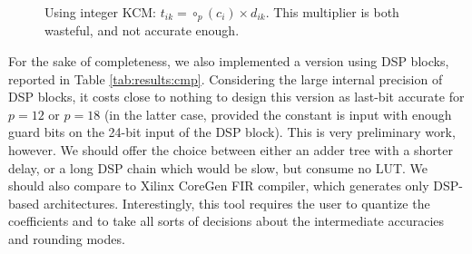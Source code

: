 \documentclass[twocolumn]{IEEEtran}
\begin{document}
\begin{figure}
  \begin{boxedminipage}{\columnwidth}
  \centering
\end{boxedminipage}
  \caption{Using integer KCM: $t_{ik}=\circ_p (c_i)\times d_{ik}$. This multiplier   is both wasteful, and not accurate enough.}
  \label{fig:intKCMmaggraph}
\end{figure}
For the sake of completeness, we also implemented a version  using DSP blocks, reported in Table \ref{tab:results:cmp}.
Considering the large internal precision of DSP blocks, it costs close to nothing to design this version as last-bit accurate for $p=12$ or $p=18$ (in the latter case, provided the constant is input with enough guard bits on the 24-bit input of the DSP block). This is very preliminary work, however. We should offer the choice between either an adder tree with a shorter delay, or a long DSP chain which would be slow, but consume no LUT. We should also compare to Xilinx CoreGen FIR compiler, which generates only DSP-based architectures.
Interestingly, this tool requires the user to quantize the coefficients and to take all sorts of decisions about the intermediate accuracies and rounding modes. 
\end{document}
